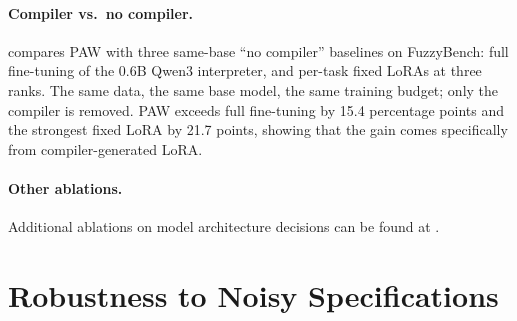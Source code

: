 \documentclass{article}
\theoremstyle{plain}
\theoremstyle{definition}
\theoremstyle{remark}
\begin{document}

\paragraph{Compiler vs.\ no compiler.}
 compares PAW with three same-base ``no compiler'' baselines on FuzzyBench: full fine-tuning of the 0.6B Qwen3 interpreter, and per-task fixed LoRAs at three ranks. The same data, the same base model, the same training budget; only the compiler is removed. PAW exceeds full fine-tuning by 15.4 percentage points and the strongest fixed LoRA by 21.7 points, showing that the gain comes specifically from compiler-generated LoRA.

\paragraph{Other ablations.}
\label{sec:ablations_misc}
Additional ablations on model architecture decisions can be found at .






\section{Robustness to Noisy Specifications}
\label{sec:noise}
\end{document}
